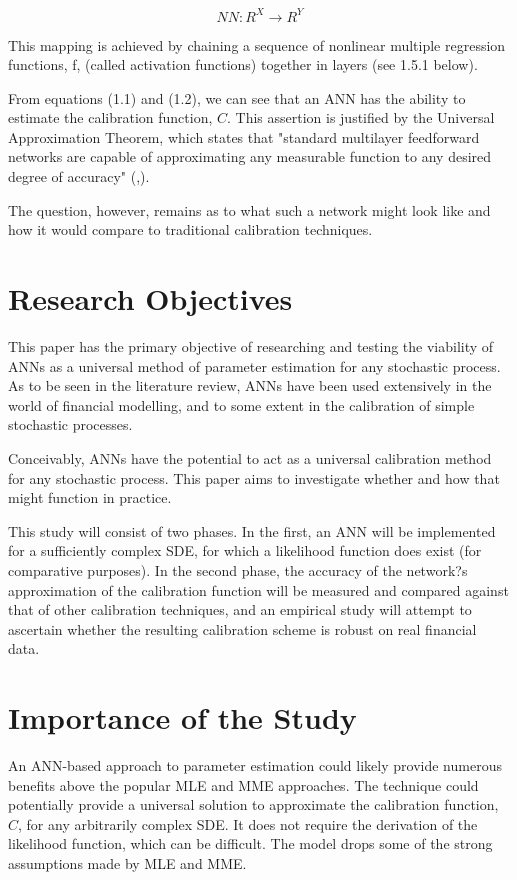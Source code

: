 \documentclass[11pt,oneside,openany,a4paper,english, report, goldenblock
]{usthesis}
\begin{document}
\begin{equation}
NN: R^X \rightarrow R^Y
\end{equation}

This mapping is achieved by chaining a sequence of nonlinear multiple regression functions, f, (called activation functions) together in layers (see 1.5.1 below).


From equations (1.1) and (1.2), we can see that an ANN has the ability to estimate the calibration function, $ C $. 
This assertion is justified by the Universal Approximation Theorem, which states that "standard multilayer feedforward networks are capable of approximating any measurable function to any desired degree of accuracy" (,\citeyear{Hornik}).


The question, however, remains as to what such a network might look like and how it would compare to traditional calibration techniques.

\section{Research Objectives}
This paper has the primary objective of researching and testing the viability of ANNs as a universal method of parameter estimation for any stochastic process. As to be seen in the literature review, ANNs have been used extensively in the world of financial modelling, and to some extent in the calibration of simple stochastic processes.


Conceivably, ANNs have the potential to act as a universal calibration method for any stochastic process. This paper aims to investigate whether and how that might function in practice.


This study will consist of two phases. In the first, an ANN will be implemented for a sufficiently complex SDE, for which a likelihood function does exist (for comparative purposes). In the second phase, the accuracy of the network?s approximation of the calibration function will be measured and compared against that of other calibration techniques, and an empirical study will attempt to ascertain whether the resulting calibration scheme is robust on real financial data.

\section{Importance of the Study}

An ANN-based approach to parameter estimation could likely provide numerous benefits above the popular MLE and MME approaches.
The technique could potentially provide a universal solution to approximate the calibration function, $C$, for any arbitrarily complex SDE.
It does not require the derivation of the likelihood function, which can be difficult.
The model drops some of the strong assumptions made by MLE and MME. 
\end{document}
